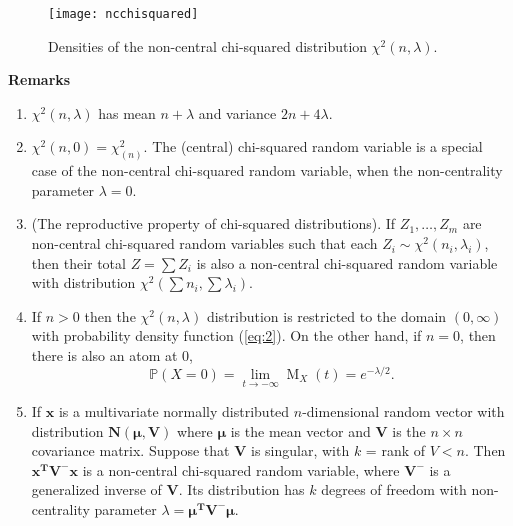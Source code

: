 \documentclass[12pt]{article}
\begin{document}
\begin{figure}[H]
\centering
\texttt{[image: ncchisquared]}
\caption{Densities of the non-central chi-squared distribution $\chi^2(n,\lambda)$.}
\end{figure}

\textbf{Remarks}
\begin{enumerate}
\item $\chi^2(n,\lambda)$ has mean $n+\lambda$ and variance $2n+4\lambda$.
\item $\chi^2(n,0)=\chi^2_{(n)}$.  The (central) chi-squared random variable is a special case of the non-central chi-squared random variable, when the non-centrality parameter $\lambda=0$.
\item (The reproductive property of chi-squared distributions).  If $Z_1,\ldots,Z_m$ are non-central chi-squared random variables such that each $Z_i\sim\chi^2(n_i,\lambda_i)$, then their total $Z=\sum Z_i$ is also a non-central chi-squared random variable with distribution $\chi^2(\sum n_i, \sum \lambda_i)$.
\item If $n>0$ then the $\chi^2(n,\lambda)$ distribution is restricted to the domain $(0,\infty)$ with probability density function (\ref{eq:2}). On the other hand, if $n=0$, then there is also an atom at $0$,
\begin{equation*}
\mathbb{P}(X=0)=\lim_{t\rightarrow-\infty}\operatorname{M}_X(t)=e^{-\lambda/2}.
\end{equation*}
\item If $\boldsymbol{x}$ is a multivariate normally distributed $n$-dimensional random vector with distribution $\boldsymbol{N(\mu,V)}$ where $\boldsymbol{\mu}$ is the mean vector and $\boldsymbol{V}$ is the $n\times n$ covariance matrix.  Suppose that $\boldsymbol{V}$ is singular, with $k$ = rank of $V<n$.  Then $\boldsymbol{x^{\operatorname{T}}V^{-}x}$ is a non-central chi-squared random variable, where $\boldsymbol{V^{-}}$ is a generalized inverse of $\boldsymbol{V}$.  Its distribution has $k$ degrees of freedom with non-centrality parameter $\lambda=\boldsymbol{\mu^{\operatorname{T}}V^{-}\mu}$.
\end{enumerate}

\end{document}
